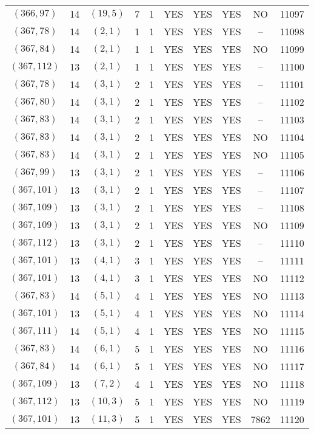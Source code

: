 \begin{longtable}{|c|c|c|c|c|c|c|c|c|c|}
$(366, 97)$ & 14 & $(19, 5)$ & 7 & 1 & YES & YES & YES & NO & 11097\\
$(367, 78)$ & 14 & $(2, 1)$ & 1 & 1 & YES & YES & YES & -- & 11098\\
$(367, 84)$ & 14 & $(2, 1)$ & 1 & 1 & YES & YES & YES & NO & 11099\\
$(367, 112)$ & 13 & $(2, 1)$ & 1 & 1 & YES & YES & YES & -- & 11100\\
$(367, 78)$ & 14 & $(3, 1)$ & 2 & 1 & YES & YES & YES & -- & 11101\\
$(367, 80)$ & 14 & $(3, 1)$ & 2 & 1 & YES & YES & YES & -- & 11102\\
$(367, 83)$ & 14 & $(3, 1)$ & 2 & 1 & YES & YES & YES & -- & 11103\\
$(367, 83)$ & 14 & $(3, 1)$ & 2 & 1 & YES & YES & YES & NO & 11104\\
$(367, 83)$ & 14 & $(3, 1)$ & 2 & 1 & YES & YES & YES & NO & 11105\\
$(367, 99)$ & 13 & $(3, 1)$ & 2 & 1 & YES & YES & YES & -- & 11106\\
$(367, 101)$ & 13 & $(3, 1)$ & 2 & 1 & YES & YES & YES & -- & 11107\\
$(367, 109)$ & 13 & $(3, 1)$ & 2 & 1 & YES & YES & YES & -- & 11108\\
$(367, 109)$ & 13 & $(3, 1)$ & 2 & 1 & YES & YES & YES & NO & 11109\\
$(367, 112)$ & 13 & $(3, 1)$ & 2 & 1 & YES & YES & YES & -- & 11110\\
$(367, 101)$ & 13 & $(4, 1)$ & 3 & 1 & YES & YES & YES & -- & 11111\\
$(367, 101)$ & 13 & $(4, 1)$ & 3 & 1 & YES & YES & YES & NO & 11112\\
$(367, 83)$ & 14 & $(5, 1)$ & 4 & 1 & YES & YES & YES & NO & 11113\\
$(367, 101)$ & 13 & $(5, 1)$ & 4 & 1 & YES & YES & YES & NO & 11114\\
$(367, 111)$ & 14 & $(5, 1)$ & 4 & 1 & YES & YES & YES & NO & 11115\\
$(367, 83)$ & 14 & $(6, 1)$ & 5 & 1 & YES & YES & YES & NO & 11116\\
$(367, 84)$ & 14 & $(6, 1)$ & 5 & 1 & YES & YES & YES & NO & 11117\\
$(367, 109)$ & 13 & $(7, 2)$ & 4 & 1 & YES & YES & YES & NO & 11118\\
$(367, 112)$ & 13 & $(10, 3)$ & 5 & 1 & YES & YES & YES & NO & 11119\\
$(367, 101)$ & 13 & $(11, 3)$ & 5 & 1 & YES & YES & YES & 7862 & 11120\\

\end{longtable}

